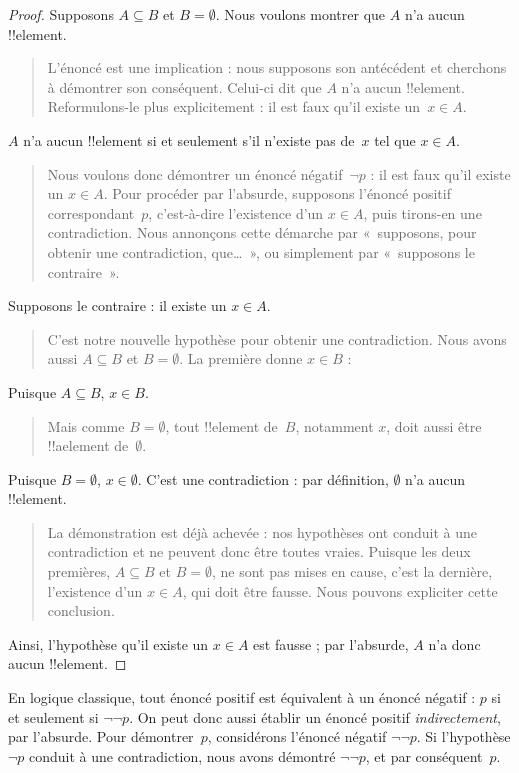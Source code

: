 \documentclass[../../../include/open-logic-section]{subfiles}
\begin{document}
\begin{proof}
  Supposons $A \subseteq B$ et
  $B = \emptyset$. Nous voulons montrer
  que $A$ n'a aucun !!{element}.
  \begin{quote}
    L'énoncé est une implication :
    nous supposons son antécédent et
    cherchons à démontrer son conséquent.
    Celui-ci dit que $A$ n'a aucun
    !!{element}. Reformulons-le plus
    explicitement : il est faux qu'il
    existe un~$x \in A$.
  \end{quote}
  $A$ n'a aucun !!{element} si et
  seulement s'il n'existe pas de~$x$
  tel que $x \in A$.
  \begin{quote}
    Nous voulons donc démontrer un
    énoncé négatif~$\lnot p$ :
    il est faux qu'il existe un
    $x \in A$. Pour procéder par
    l'absurde, supposons l'énoncé
    positif correspondant~$p$,
    c'est-à-dire l'existence d'un
    $x \in A$, puis tirons-en
    une contradiction. Nous annonçons
    cette démarche par «~supposons,
    pour obtenir une contradiction,
    que…~», ou simplement par
    «~supposons le contraire~».
  \end{quote}
  Supposons le contraire :
  il existe un $x \in A$.
  \begin{quote}
    C'est notre nouvelle hypothèse
    pour obtenir une contradiction.
    Nous avons aussi $A \subseteq B$
    et $B = \emptyset$. La première
    donne $x \in B$ :
  \end{quote}
  Puisque $A \subseteq B$, $x \in B$.
  \begin{quote}
    Mais comme $B = \emptyset$,
    tout !!{element} de~$B$,
    notamment $x$, doit aussi être
    !!a{element} de~$\emptyset$.
  \end{quote}
  Puisque $B = \emptyset$,
  $x \in \emptyset$. C'est une
  contradiction : par définition,
  $\emptyset$ n'a aucun !!{element}.
  \begin{quote}
    La démonstration est déjà achevée :
    nos hypothèses ont conduit à une
    contradiction et ne peuvent donc
    être toutes vraies. Puisque les
    deux premières, $A \subseteq B$
    et $B = \emptyset$, ne sont pas
    mises en cause, c'est la dernière,
    l'existence d'un $x \in A$, qui
    doit être fausse. Nous pouvons
    expliciter cette conclusion.
  \end{quote}
  Ainsi, l'hypothèse qu'il existe
  un $x \in A$ est fausse ; par
  l'absurde, $A$ n'a donc aucun
  !!{element}.
\end{proof}

En logique classique, tout énoncé positif
est équivalent à un énoncé négatif :
$p$ si et seulement si $\lnot\lnot p$.
On peut donc aussi établir un énoncé
positif \emph{indirectement}, par l'absurde.
Pour démontrer~$p$, considérons l'énoncé
négatif $\lnot\lnot p$. Si l'hypothèse
$\lnot p$ conduit à une contradiction,
nous avons démontré $\lnot\lnot p$,
et par conséquent~$p$.
\end{document}
